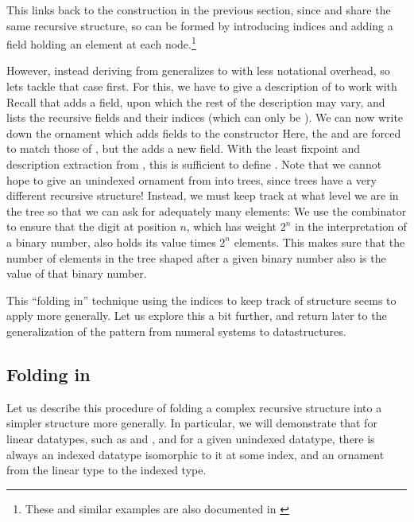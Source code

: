 This links back to the construction in the previous section, since \bN{} and  share the same recursive structure, so  can be formed by introducing indices and adding a field holding an element at each node.\footnote{These and similar examples are also documented in \cite{progorn}} 

However, instead deriving  from \bN{} generalizes to \bL{} with less notational overhead, so lets tackle that case first. For this, we have to give a description of \bN{} to work with
Recall that  adds a field, upon which the rest of the description may vary, and  lists the recursive fields and their indices (which can only be ).
We can now write down the ornament which adds fields to the  constructor
Here, the  and  are forced to match those of ,
but the  adds a new field. With the least fixpoint and description extraction from \cite{progorn}, this is sufficient to define . Note that we cannot hope to give an unindexed ornament from \bL{}
into trees, since trees have a very different recursive structure! Instead, we must keep track at what level we are in the tree so that we can ask for adequately many elements:
We use the  combinator to ensure that the digit at position $n$, which has weight $2^n$ in the interpretation of a binary number, also holds its value times $2^n$ elements. This makes sure that the number of elements in the tree shaped after a given binary number also is the value of that  binary number.

This ``folding in'' technique using the indices to keep track of structure seems to apply more generally. Let us explore this a bit further, and return later to the generalization of the pattern from numeral systems to datastructures.

\subsection{Folding in}\label{ssec:flattening}
Let us describe this procedure of folding a complex recursive structure into a simpler structure more generally. In particular, we will demonstrate that for linear datatypes, such as \bN{} and \bL{}, and for a given unindexed datatype, there is always an indexed datatype isomorphic to it at some index, and an ornament from the linear type to the indexed type. 

